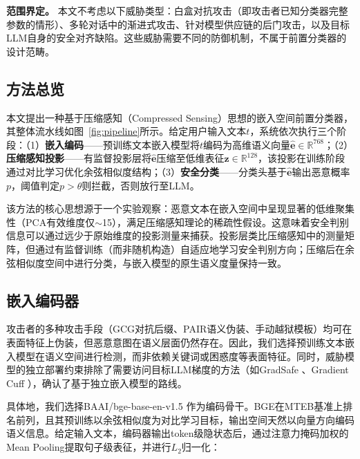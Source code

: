 \documentclass[conference]{IEEEtran}
\begin{document}
\textbf{范围界定。} 本文不考虑以下威胁类型：白盒对抗攻击（即攻击者已知分类器完整参数的情形）、多轮对话中的渐进式攻击、针对模型供应链的后门攻击，以及目标LLM自身的安全对齐缺陷。这些威胁需要不同的防御机制，不属于前置分类器的设计范畴。

\subsection{方法总览}

本文提出一种基于压缩感知（Compressed Sensing）思想的嵌入空间前置分类器，其整体流水线如图~\ref{fig:pipeline}所示。给定用户输入文本$t$，系统依次执行三个阶段：（1）\textbf{嵌入编码}——预训练文本嵌入模型将$t$编码为高维语义向量$\hat{\mathbf{e}} \in \mathbb{R}^{768}$；（2）\textbf{压缩感知投影}——有监督投影层将$\hat{\mathbf{e}}$压缩至低维表征$\mathbf{z} \in \mathbb{R}^{128}$，该投影在训练阶段通过对比学习优化余弦相似度结构；（3）\textbf{安全分类}——分类头基于$\hat{\mathbf{e}}$输出恶意概率$p$，阈值判定$p > \theta$则拦截，否则放行至LLM。


该方法的核心思想源于一个实验观察：恶意文本在嵌入空间中呈现显著的低维聚集性（PCA有效维度仅$\sim$15），满足压缩感知理论的稀疏性假设。这意味着安全判别信息可以通过远少于原始维度的投影测量来捕获。投影层类比压缩感知中的测量矩阵，但通过有监督训练（而非随机构造）自适应地学习安全判别方向；压缩后在余弦相似度空间中进行分类，与嵌入模型的原生语义度量保持一致。

\subsection{嵌入编码器}

攻击者的多种攻击手段（GCG对抗后缀、PAIR语义伪装、手动越狱模板）均可在表面特征上伪装，但恶意意图在语义层面仍然存在。因此，我们选择预训练文本嵌入模型在语义空间进行检测，而非依赖关键词或困惑度等表面特征。同时，威胁模型的独立部署约束排除了需要访问目标LLM梯度的方法（如GradSafe \cite{b5}、Gradient Cuff \cite{b7}），确认了基于独立嵌入模型的路线。

具体地，我们选择BAAI/bge-base-en-v1.5 \cite{b10} 作为编码骨干。BGE在MTEB基准上排名前列，且其预训练以余弦相似度为对比学习目标，输出空间天然以向量方向编码语义信息。给定输入文本，编码器输出token级隐状态后，通过注意力掩码加权的Mean Pooling提取句子级表征，并进行$L_2$归一化：
\end{document}
